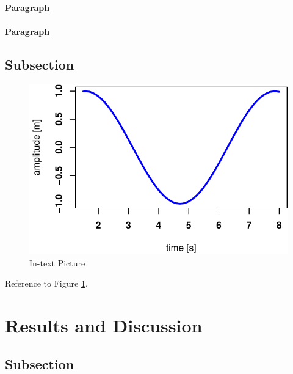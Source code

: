 \documentclass[fleqn,10pt,lineno]{wlpeerj} %
\theoremstyle{definition}
\theoremstyle{definition}
\theoremstyle{definition}
\theoremstyle{remark}
\begin{document}
\lipsum[6] 

\paragraph{Paragraph}

\lipsum[7]  \paragraph{Paragraph} \lipsum[8] 

\subsection*{Subsection}\label{subsection-1}

\lipsum[9] 

\begin{figure}
\includegraphics[width=1\linewidth]{peer_j_migration_dynamics_files/figure-latex/results-1} \caption{In-text Picture}\label{fig:results}
\end{figure}

Reference to Figure \ref{fig:results}.

\section*{Results and Discussion}\label{results-and-discussion}

\lipsum[10] 

\subsection*{Subsection}\label{subsection-2}
\end{document}
